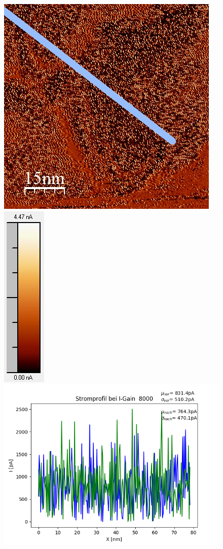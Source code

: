 \documentclass[12pt,a4paper]{article}
\begin{document}
\begin{figure}[H]
\includegraphics[scale=0.6]{Bilder/Anhang/IGain/Strom/8000_IGain_Strom_nach.jpg}
\includegraphics[scale=0.6]{Bilder/Anhang/IGain/Strom/8000_IGain_Strom_nach_Skala.jpg}
\includegraphics[scale=0.5]{Bilder/Anhang/IGain/Strom/Strom_Profil_IGain_8000.png}

\end{figure}
\end{document}
